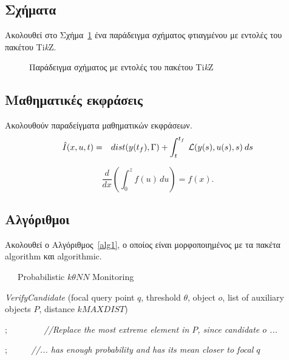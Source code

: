 \subsection{Σχήματα}
Ακολουθεί στο Σχήμα~\ref{fig2} ένα παράδειγμα σχήματος φτιαγμένου με εντολές του πακέτου Ti\textit{k}Z.
\begin{figure}[htb]
\begin{center}
\end{center}
\caption{Παράδειγμα σχήματος με εντολές του πακέτου Ti\textit{k}Z}	
\label{fig2}
\end{figure}

\subsection{Μαθηματικές εκφράσεις}
Ακολουθούν παραδείγματα μαθηματικών εκφράσεων.
\begin{eqnarray}
\hat{I}(x,u,t)     &=& dist(y(t_f),\Gamma)
+  \int_t^{t_f} \: {\cal L}( y(s),u(s),s) \: ds
\label{con11b}
\end{eqnarray}

     \[
        \frac{d}{dx}\left( \int_{0}^{z} f(u)\,du\right)=f(x).
     \]

\subsection{Αλγόριθμοι}
Ακολουθεί ο Αλγόριθμος~\ref{alg1}, ο οποίος είναι μορφοποιημένος με τα πακέτα algorithm και algorithmic.

\begin{algorithm}[htb]
\caption{\ \ \ Probabilistic $k\theta NN$ Monitoring}
\begin{algorithmic}[1]
\begin{small}

 {\em VerifyCandidate} (focal query point $q$, threshold $\theta$, object $o$, list of auxiliary objects $P$, distance $kMAXDIST$) 


;   \ \ \ \ \ \ \ \ {\em //Replace the most extreme element in $P$, since candidate $o$ ... }

;  \ \ \ \ \ {\em //... has enough probability and has its mean closer to focal $q$ }

\ENDIF



\end{small}
\end{algorithmic}
\label{alg1}
\end{algorithm}

